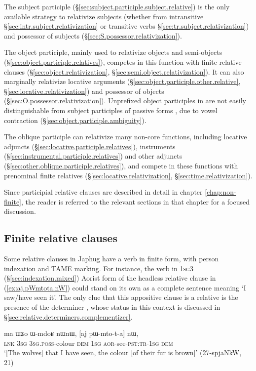 The subject participle (§\ref{sec:subject.participle.subject.relative}) is the only available strategy to relativize subjects (whether from intransitive §\ref{sec:intr.subject.relativization} or transitive verbs §\ref{sec:tr.subject.relativization}) and possessor of subjects (§\ref{sec:S.possessor.relativization}).

The object participle, mainly used to relativize objects and semi-objects (§\ref{sec:object.participle.relatives}), competes in this function with finite relative clauses (§\ref {sec:object.relativization}, §\ref{sec:semi.object.relativization}). It can also marginally relativize locative arguments (§\ref{sec:object.participle.other.relative}, §\ref{sec:locative.relativization}) and possessor of objects (§\ref{sec:O.possessor.relativization}). Unprefixed object participles in  are not easily distinguishable from subject participles of passive forms , due to vowel contraction (§\ref{sec:object.participle.ambiguity}).
 
The oblique participle can relativize many non-core functions, including locative adjuncts (§\ref{sec:locative.participle.relatives}), instruments (§\ref{sec:instrumental.participle.relatives}) and other adjuncts (§\ref{sec:other.oblique.participle.relatives}), and compete in these functions with prenominal finite relatives (§\ref{sec:locative.relativization}, §\ref{sec:time.relativization}).
 
Since participial relative clauses are described in detail in chapter \ref{chap:non-finite}, the reader is referred to the relevant sections in that chapter for a focused discussion.
 
\subsection{Finite relative clauses} \label{sec:finite.relatives}
Some relative clauses in Japhug have a verb in finite form, with person indexation and TAME marking. For instance, the verb  in \textsc{1sg}\fl{}3 (§\ref{sec:indexation.mixed}) Aorist form of the headless relative clause in (\ref{ex:aj.pWmtota.nW}) could stand on its own as a complete sentence meaning `I saw/have seen it'. The only clue that this appositive clause is a relative is the presence of the determiner , whose status in this context is discussed in §\ref{sec:relative.determiners.complementizer}.

\begin{exe}
\ex \label{ex:aj.pWmtota.nW}
 \gll ma ɯʑo ɯ-mdoʁ nɯnɯ, [aj pɯ-mto-t-a] nɯ, \\
 \textsc{lnk} \textsc{3sg} \textsc{3sg}.\textsc{poss}-colour \textsc{dem} \textsc{1sg} \textsc{aor}-see-\textsc{pst}:\textsc{tr}-\textsc{1sg} \textsc{dem} \\
 \glt `[The wolves] that I have seen, the colour [of their fur is brown]' (27-spjaNkW, 21)
\end{exe}

